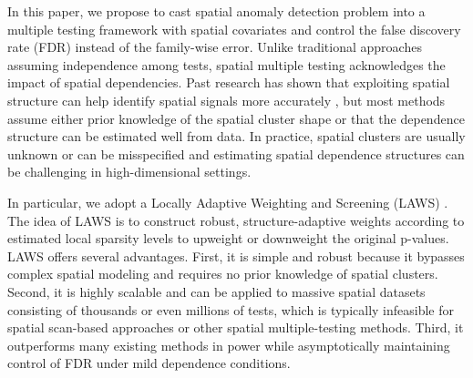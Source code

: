 \documentclass[11pt]{article}
\begin{document}
In this paper, we propose to cast spatial anomaly detection problem into a multiple testing framework with spatial covariates and control the false discovery rate (FDR) \citep{benjamini1995controlling} instead of the family-wise error. Unlike traditional approaches assuming independence among tests, spatial multiple testing acknowledges the impact of spatial dependencies. Past research has shown that exploiting spatial structure can help identify spatial signals more accurately \citep[see, e.g.,][]{benjamini2007false, sun2015false,lei2018adapt}, but most methods assume either prior knowledge of the spatial cluster shape or that the dependence structure can be estimated well from data. In practice, spatial clusters are usually unknown or can be misspecified and estimating spatial dependence structures can be challenging in high-dimensional settings.

In particular, we adopt a Locally Adaptive Weighting and Screening (LAWS) \citep{cai2022laws}. The idea of LAWS is to construct robust, structure-adaptive weights according to estimated local sparsity levels to upweight or downweight the original p-values. LAWS offers several advantages. First, it is simple and robust because it bypasses complex spatial modeling and requires no prior knowledge of spatial clusters. Second, it is highly scalable and can be applied to massive spatial datasets consisting of thousands or even millions of tests, which is typically infeasible for spatial scan-based approaches or other spatial multiple-testing methods. Third, it outperforms many existing methods in power while asymptotically maintaining control of FDR under mild dependence conditions.
\end{document}
